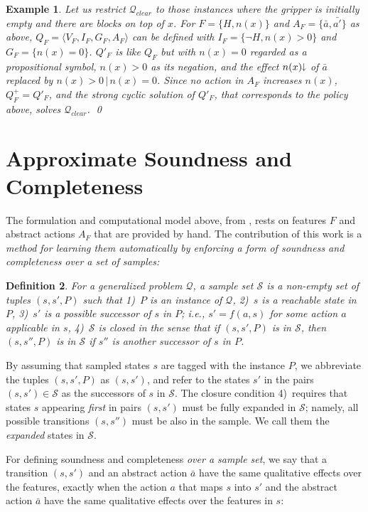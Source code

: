 \documentclass[letterpaper]{article} %
\newcommand{\tup}[1]{\langle #1 \rangle}
\newtheorem{definition}{Definition}
\newtheorem{example}[definition]{Example}
\newcommand{\Q}{\mathcal{Q}}
\renewcommand{\S}{\mathcal{S}}
\newcommand{\mminus}{\hspace{-.05em}\raisebox{.15ex}{\footnotesize$\downarrow$}}
\begin{document}
\begin{example}
  Let us restrict  $\Q_{clear}$  to those  instances where  the gripper is initially empty
  and there are blocks on top of $x$. For $F=\{H,n(x)\}$  and $A_F=\{\bar{a},\bar{a'}\}$ as above, 
  $Q_F=\tup{V_F,I_F,G_F,A_F}$ can be defined with $I_F=\{\neg H, n(x) > 0\}$ and $G_F=\{n(x)=0\}$.
  $Q'_F$ is like $Q_F$ but with $n(x)=0$ regarded as a propositional symbol, $n(x) > 0$
  as its negation, and the effect $n(x)\mminus$ of  $\bar{a}$ replaced by  $n(x) > 0 \, | \, n(x)=0$.
  Since  no action in $A_F$  increases $n(x)$,   $Q^+_F=Q'_F$, and the strong cyclic solution  of $Q'_F$,
  that corresponds to the policy above, solves $\Q_{clear}$. \qed
\end{example}


\section{Approximate Soundness and Completeness}

The formulation and   computational model above, from  \cite{bonet:ijcai2018}, 
rests  on features $F$ and  abstract actions $A_F$ that are provided by hand.
The contribution of this work is a \emph{method for  learning   them automatically
by enforcing a form of soundness and completeness over a set of samples:}

\begin{definition}
  For a generalized problem $\Q$, a \emph{sample set}  $\S$ is a non-empty set of tuples  $(s,s',P)$
  such that 1)~$P$ is an instance of $\Q$, 2)~$s$ is a reachable state in $P$, 3)~$s'$
  is a possible successor of $s$ in $P$; i.e., $s'=f(a,s)$ for some action $a$ applicable in $s$,
  4)~$\S$ is closed in the sense  that if $(s,s',P)$ is in $\S$, then $(s,s'',P)$ is in $\S$  if $s''$ is another
  successor of $s$ in $P$.
\end{definition}

By assuming that sampled states $s$ are tagged with the instance $P$, 
we abbreviate the tuples $(s,s',P)$ as $(s,s')$, and refer to the
states $s'$ in  the pairs $(s,s') \in \S$ as the successors of
$s$ in $\S$. The  closure condition 4)~requires that
states $s$ appearing \emph{first} in pairs $(s,s')$ must be fully expanded in $\S$;
namely, all possible transitions $(s,s'')$ must be also in the sample. We call them
the \emph{expanded} states in $\S$.

For defining soundness and completeness \emph{over a sample set}, we say that  a transition $(s,s')$ and an abstract action $\bar{a}$
have  the same qualitative effects over the features,  exactly when  the action $a$ that maps $s$ into $s'$ and the abstract action
$\bar{a}$ have the same qualitative effects over the features in $s$:
\end{document}
